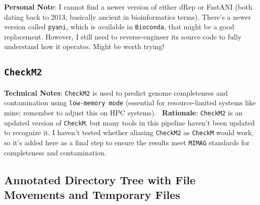 \documentclass[11pt]{report}
\begin{document}
{\begin{tcolorbox}[colback=gray!10!white, coltitle=white, colframe=gray!80!black, title=A Personal Note]
	\textbf{Personal Note}: I cannot find a newer version of either dRep or FastANI (both dating back to 2013, basically ancient in bioinformatics terms). There's a newer version called \texttt{pyani}, which is available in \texttt{Bioconda}, that might be a good replacement. However, I still need to reverse-engineer its source code to fully understand how it operates. Might be worth trying!
\end{tcolorbox}


\subsection{\texttt{CheckM2}} \textbf{Technical Notes}: \texttt{CheckM2} is used to predict genome completeness and contamination using \texttt{low-memory mode} (essential for resource-limited systems like mine; remember to adjust this on HPC systems). \ \textbf{Rationale}: \texttt{CheckM2} is an updated version of \texttt{CheckM}, but many tools in this pipeline haven't been updated to recognize it. I haven't tested whether aliasing \texttt{CheckM2} as \texttt{CheckM} would work, so it’s added here as a final step to ensure the results meet \texttt{MIMAG} standards for completeness and contamination.
\subsection{Annotated Directory Tree with File Movements and Temporary Files}

}
\end{document}
